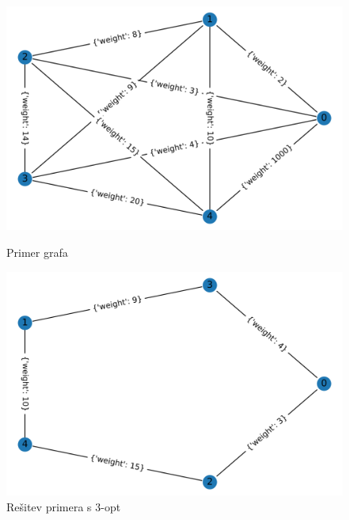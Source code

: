 \documentclass[12pt, a4paper]{article}
\begin{document}
\begin{figure}[!h]
    
    \begin{minipage}{0.5\textwidth}
    \includegraphics[width=8 cm]{primeri/primer1.png}
    \caption{Primer grafa}
    \label{primer_3_opt}
  \end{minipage}
 \hspace{1cm}
  \begin{minipage}{0.5\textwidth}
    \includegraphics[width=8 cm]{primeri/primer1_3opt.png}
    \caption{Rešitev primera s 3-opt}
    \label{resitev_3_opt}
  \end{minipage}
    
\end{figure}
\end{document}
